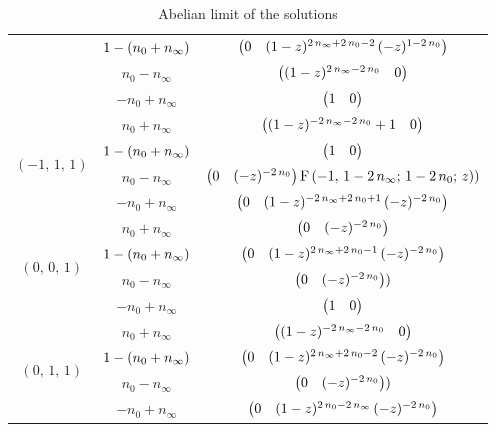 \begin{table}[tbp]
\begin{tabular}{@{}ccc@{}}
    \\
                                                      &
    $1 - \qty( n_{0} + n_{\infty} )$ &
    $\mqty( 0 & (1-z)^{2\, n_{\infty} + 2\, n_{0} - 2}\, (-z)^{1 - 2\, n_{0}} )$
    \\
                                   &
    $n_{0} - n_{\infty}$ &
    $\mqty( (1-z)^{2\, n_{\infty} - 2\, n_{0}} & 0 )$
    \\
                                     &
    $- n_{0} + n_{\infty}$ &
    $\mqty( 1 & 0 )$
    \\
    \midrule
    \multirow{4}{*}{$(-1,\, 1,\, 1)$} &
    $n_{0} + n_{\infty}$    &
    $\mqty( (1-z)^{-2\, n_{\infty} - 2\, n_{0}} + 1 & 0 )$
    \\
                                                      &
    $1 - \qty( n_{0} + n_{\infty} )$ &
    $\mqty( 1 & 0 )$
    \\
                                   &
    $n_{0} - n_{\infty}$ &
    $\mqty( 0 & (-z)^{-2\, n_{0}})\, \hyp{-1}{1 - 2\, n_{\infty}}{1 - 2\, n_{0}}{z} )$
    \\
                                     &
    $- n_{0} + n_{\infty}$ &
    $\mqty( 0 & (1-z)^{-2\, n_{\infty} + 2\, n_{0} + 1}\, (-z)^{-2\, n_{0}} )$
    \\
    \midrule
    \multirow{4}{*}{$(0,\, 0,\, 1)$} &
    $n_{0} + n_{\infty}$    &
    $\mqty( 0 & (-z)^{-2\, n_{0}} )$
    \\
                                                      &
    $1 - \qty( n_{0} + n_{\infty} )$ &
    $\mqty( 0 & (1-z)^{2\, n_{\infty} + 2\, n_{0} - 1}\, (-z)^{-2\, n_{0}} )$
    \\
                                   &
    $n_{0} - n_{\infty}$ &
    $\mqty( 0 & (-z)^{-2\, n_{0}}) )$
    \\
                                     &
    $- n_{0} + n_{\infty}$ &
    $\mqty( 1 & 0 )$
    \\
    \midrule
    \multirow{4}{*}{$(0,\, 1,\, 1)$} &
    $n_{0} + n_{\infty}$    &
    $\mqty( (1-z)^{-2\, n_{\infty} -2\, n_{0}} & 0 )$
    \\
                                                      &
    $1 - \qty( n_{0} + n_{\infty} )$ &
    $\mqty( 0 & (1-z)^{2\, n_{\infty} + 2\, n_{0} - 2}\, (-z)^{-2\, n_{0}} )$
    \\
                                   &
    $n_{0} - n_{\infty}$ &
    $\mqty( 0 & (-z)^{-2\, n_{0}}) )$
    \\
                                     &
    $- n_{0} + n_{\infty}$ &
    $\mqty( 0 & (1-z)^{2\, n_{0} - 2\, n_{\infty}}\, (-z)^{-2\, n_{0}} )$
    \\
    \bottomrule
  \end{tabular}
  \caption{Abelian limit of the solutions}
  \label{tab:Left_Abelian_solutions}
\end{table}


